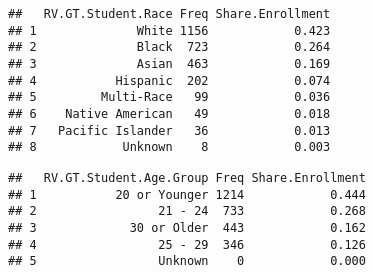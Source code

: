 \documentclass[]{article}
\newenvironment{Shaded}{\begin{snugshade}}{\end{snugshade}}
\newcommand{\KeywordTok}[1]{\textcolor[rgb]{0.13,0.29,0.53}{\textbf{#1}}}
\newcommand{\DataTypeTok}[1]{\textcolor[rgb]{0.13,0.29,0.53}{#1}}
\newcommand{\DecValTok}[1]{\textcolor[rgb]{0.00,0.00,0.81}{#1}}
\newcommand{\StringTok}[1]{\textcolor[rgb]{0.31,0.60,0.02}{#1}}
\newcommand{\OperatorTok}[1]{\textcolor[rgb]{0.81,0.36,0.00}{\textbf{#1}}}
\newcommand{\NormalTok}[1]{#1}
\begin{document}
\begin{verbatim}
##   RV.GT.Student.Race Freq Share.Enrollment
## 1              White 1156            0.423
## 2              Black  723            0.264
## 3              Asian  463            0.169
## 4           Hispanic  202            0.074
## 5         Multi-Race   99            0.036
## 6    Native American   49            0.018
## 7   Pacific Islander   36            0.013
## 8            Unknown    8            0.003
\end{verbatim}

\begin{Shaded}
\end{Shaded}

\begin{verbatim}
##   RV.GT.Student.Age.Group Freq Share.Enrollment
## 1           20 or Younger 1214            0.444
## 2                 21 - 24  733            0.268
## 3             30 or Older  443            0.162
## 4                 25 - 29  346            0.126
## 5                 Unknown    0            0.000
\end{verbatim}
\end{document}
